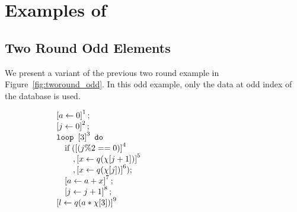 
\chapter{Examples of {\ADAPTSYSTEM}}
\label{ch:adapt-example}


\section{Two Round Odd Elements}
\label{sec:adapt-example-tr-odd}
We present a variant of the previous two round example in Figure~\ref{fig:tworound_odd}. In this odd example, only the data at odd index of the database is used.
%
{
\begin{figure}
\begin{subfigure}{.4\textwidth}
\begin{centering}
$\begin{array}{l}
   \left[  \mathrel{ a \leftarrow 0 }   \right]^{1} ; \\
    \left[ \mathrel{ j \leftarrow 0 }  \right]^{2} ; \\
    \mathtt{loop} ~ \left[ 3 \right]^{3} ~ \mathtt{do} ~ \\
   \quad 
     \mbox{if\;} ( \left[ ( j \% 2 == 0) \right]^{4}\\
     \quad \quad ,\left[  \mathrel{ x \leftarrow  q(\chi[j+1]) }  \right]^{5}  \\
     \quad \quad ,\left[ \mathrel{ x \leftarrow  q(\chi[j])  } \right]^{6} ) ;\\
     \quad \left[ \mathrel{ a \leftarrow  a+x }  \right]^{7}  ;\\
     \quad \left[  \mathrel{ j \leftarrow j+1 }  \right]^{8}      ;\\
 \left[ l \leftarrow q(a*\chi[3])  \right]^{9}\\
\end{array} $
\caption{}
\end{centering}
\end{subfigure}
\begin{subfigure}{0.5\textwidth}
\end{subfigure}
\end{figure}}
